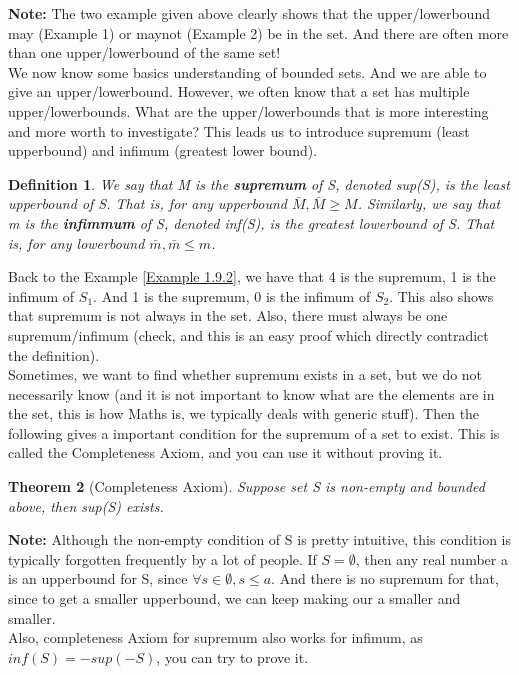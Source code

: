 \documentclass{book}
\newtheorem{theorem}{Theorem}[section]
\newtheorem{definition}[theorem]{Definition}
\begin{document}
\textbf{Note:} The two example given above clearly shows that the upper/lowerbound may (Example 1) or maynot (Example 2) be in the set. And there are often more than one upper/lowerbound of the same set! \\

We now know some basics understanding of bounded sets. And we are able to give an upper/lowerbound. However, we often know that a set has multiple upper/lowerbounds. What are the upper/lowerbounds that is more interesting and more worth to investigate? This leads us to introduce supremum (least upperbound) and infimum (greatest lower bound).

\begin{definition}
    We say that M is the \textbf{supremum} of S, denoted sup(S), is the least upperbound of S. That is, for any upperbound $\bar{M}, \bar{M} \geq M$.
    Similarly, we say that m is the \textbf{infimmum} of S, denoted inf(S), is the greatest lowerbound of S. That is, for any lowerbound $\bar{m}, \bar{m} \leq m$.
\end{definition}

Back to the Example \ref{Example 1.9.2}, we have that 4 is the supremum, 1 is the infimum of $S_{1}$. And 1 is the supremum, 0 is the infimum of $S_{2}$. This also shows that supremum is not always in the set. Also, there must always be one supremum/infimum (check, and this is an easy proof which directly contradict the definition). \\

Sometimes, we want to find whether supremum exists in a set, but we do not necessarily know (and it is not important to know what are the elements are in the set, this is how Maths is, we typically deals with generic stuff). Then the following gives a important condition for the supremum of a set to exist. This is called the Completeness Axiom, and you can use it without proving it.

\begin{theorem}[Completeness Axiom] \label{Theorem 1.9.4}
    Suppose set S is non-empty and bounded above, then sup(S) exists.
\end{theorem}

\textbf{Note:} Although the non-empty condition of S is pretty intuitive, this condition is typically forgotten frequently by a lot of people. If $S = \emptyset$, then any real number a is an upperbound for S, since $\forall s \in \emptyset, s \leq a$. And there is no supremum for that, since to get a smaller upperbound, we can keep making our a smaller and smaller. \\
Also, completeness Axiom for supremum also works for infimum, as $inf(S) = -sup(-S)$, you can try to prove it.
\end{document}
